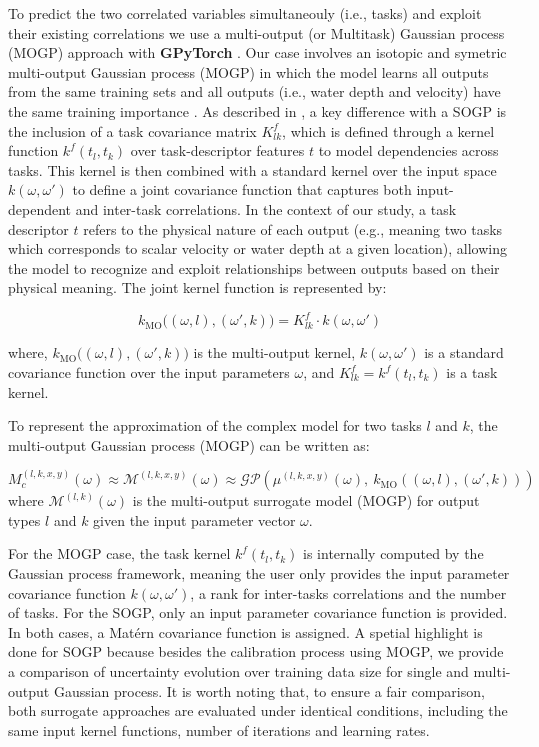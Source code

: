 \documentclass[draft,linenumbers,onecolumn]{agujournal2019} %
\begin{document}
To predict the two correlated variables simultaneouly (i.e., tasks) and exploit their existing correlations we use a multi-output (or Multitask) Gaussian process (MOGP) approach with \textbf{GPyTorch} \cite{gardner2018gpytorch}. Our case involves an isotopic and symetric multi-output Gaussian process (MOGP) in which the model learns all outputs from the same training sets and all outputs (i.e., water depth and velocity) have the same training importance \cite{liu2018remarks}. As described in , a key difference with a SOGP is the inclusion of a task covariance matrix $K_{lk}^{f}$, which is defined through a kernel function $k^{f}{(t_l, t_k)}$ over task-descriptor features $t$ to model dependencies across tasks. This kernel is then combined with a standard kernel over the input space $k(\omega, \omega')$ to define a joint covariance function that captures both input-dependent and inter-task correlations. In the context of our study, a task descriptor $t$ refers to the physical nature of each output (e.g., meaning two tasks which corresponds to scalar velocity or water depth at a given location), allowing the model to recognize and exploit relationships between outputs based on their physical meaning. The joint kernel function is represented by: 

\[
 k_{\text{MO}}\big((\omega, l), (\omega', k)\big) =  K_{lk}^{f} \cdot k(\omega, \omega')
\]

where, $k_{\text{MO}}\big((\omega, l), (\omega', k)\big)$ is the multi-output kernel, $k(\omega, \omega')$ is a standard covariance function over the input parameters $\omega$, and  $K_{lk}^{f} = k^{f}{(t_l, t_k)}$ is a task kernel.

To represent the approximation of the complex model for two tasks $l$ and $k$, the multi-output Gaussian process (MOGP) can be written as:

\[
M_c^{(l,k,x,y)}(\omega) \approx \mathcal{M}^{(l,k,x,y)}(\omega) \approx \mathcal{GP}\left(\mu^{(l,k,x,y)}(\omega),\ k_{\text{MO}}\left((\omega, l), (\omega', k)\right)\right)
\]
where $\mathcal{M}^{(l,k)}(\omega)$ is the multi-output surrogate model (MOGP) for output types $l$ and $k$ given the input parameter vector $\omega$.


For the MOGP case, the task kernel $k^{f}{(t_l, t_k)}$ is internally computed by the Gaussian process framework, meaning the user only provides the input parameter covariance function $k(\omega, \omega')$, a rank for inter-tasks correlations and the number of tasks. For the SOGP, only an input parameter covariance function is provided. In both cases, a Matérn covariance function is assigned. A spetial highlight is done for SOGP because besides the calibration process using MOGP, we provide a comparison of uncertainty evolution over training data size for single and multi-output Gaussian process. It is worth noting that, to ensure a fair comparison, both surrogate approaches are evaluated under identical conditions, including the same input kernel functions, number of iterations and learning rates.
\end{document}
